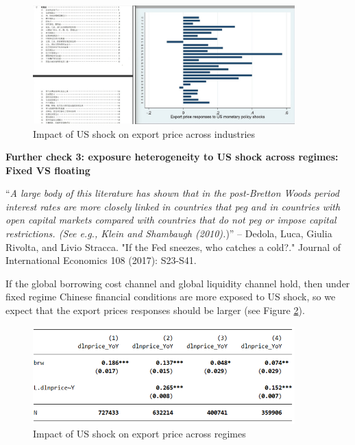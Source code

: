 \documentclass[12pt]{article}
\begin{document}
\begin{figure}
     \centering
         \includegraphics[width=0.9\textwidth]{latex/2023.10/Picture/Industry.png}
         \caption{Impact of US shock on export price across industries}
         \label{fig:Industry}
\end{figure}


\textbf{Further check 3: exposure heterogeneity to US shock across regimes: Fixed VS floating}

“\textit{A large body of this literature has shown that in the post-Bretton Woods period interest rates are more closely linked in countries that peg and in countries with open capital markets compared with countries that do not peg or impose capital restrictions. (See e.g., Klein and Shambaugh (2010).})” -- Dedola, Luca, Giulia Rivolta, and Livio Stracca. "If the Fed sneezes, who catches a cold?." Journal of International Economics 108 (2017): S23-S41.


If the global borrowing cost channel and global liquidity channel hold, then under fixed regime Chinese financial conditions are more exposed to US shock, so we expect that the export prices responses should be larger (see Figure \ref{fig:regime}). 

\begin{figure}
     \centering
         \includegraphics[width=0.9\textwidth]{latex/2023.10/Picture/regime.png}
         \caption{Impact of US shock on export price across regimes}
         \label{fig:regime}
\end{figure}
\end{document}
